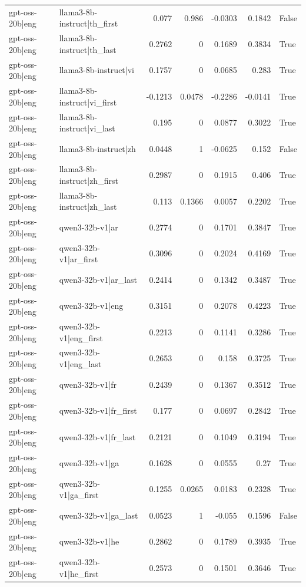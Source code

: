 \begin{table}
\begin{tabular}{l l r r r r l}
gpt-oss-20b|eng & llama3-8b-instruct|th_first & 0.077 & 0.986 & -0.0303 & 0.1842 & False \\
gpt-oss-20b|eng & llama3-8b-instruct|th_last & 0.2762 & 0 & 0.1689 & 0.3834 & True \\
gpt-oss-20b|eng & llama3-8b-instruct|vi & 0.1757 & 0 & 0.0685 & 0.283 & True \\
gpt-oss-20b|eng & llama3-8b-instruct|vi_first & -0.1213 & 0.0478 & -0.2286 & -0.0141 & True \\
gpt-oss-20b|eng & llama3-8b-instruct|vi_last & 0.195 & 0 & 0.0877 & 0.3022 & True \\
gpt-oss-20b|eng & llama3-8b-instruct|zh & 0.0448 & 1 & -0.0625 & 0.152 & False \\
gpt-oss-20b|eng & llama3-8b-instruct|zh_first & 0.2987 & 0 & 0.1915 & 0.406 & True \\
gpt-oss-20b|eng & llama3-8b-instruct|zh_last & 0.113 & 0.1366 & 0.0057 & 0.2202 & True \\
gpt-oss-20b|eng & qwen3-32b-v1|ar & 0.2774 & 0 & 0.1701 & 0.3847 & True \\
gpt-oss-20b|eng & qwen3-32b-v1|ar_first & 0.3096 & 0 & 0.2024 & 0.4169 & True \\
gpt-oss-20b|eng & qwen3-32b-v1|ar_last & 0.2414 & 0 & 0.1342 & 0.3487 & True \\
gpt-oss-20b|eng & qwen3-32b-v1|eng & 0.3151 & 0 & 0.2078 & 0.4223 & True \\
gpt-oss-20b|eng & qwen3-32b-v1|eng_first & 0.2213 & 0 & 0.1141 & 0.3286 & True \\
gpt-oss-20b|eng & qwen3-32b-v1|eng_last & 0.2653 & 0 & 0.158 & 0.3725 & True \\
gpt-oss-20b|eng & qwen3-32b-v1|fr & 0.2439 & 0 & 0.1367 & 0.3512 & True \\
gpt-oss-20b|eng & qwen3-32b-v1|fr_first & 0.177 & 0 & 0.0697 & 0.2842 & True \\
gpt-oss-20b|eng & qwen3-32b-v1|fr_last & 0.2121 & 0 & 0.1049 & 0.3194 & True \\
gpt-oss-20b|eng & qwen3-32b-v1|ga & 0.1628 & 0 & 0.0555 & 0.27 & True \\
gpt-oss-20b|eng & qwen3-32b-v1|ga_first & 0.1255 & 0.0265 & 0.0183 & 0.2328 & True \\
gpt-oss-20b|eng & qwen3-32b-v1|ga_last & 0.0523 & 1 & -0.055 & 0.1596 & False \\
gpt-oss-20b|eng & qwen3-32b-v1|he & 0.2862 & 0 & 0.1789 & 0.3935 & True \\
gpt-oss-20b|eng & qwen3-32b-v1|he_first & 0.2573 & 0 & 0.1501 & 0.3646 & True \\

\end{tabular}
\end{table}
